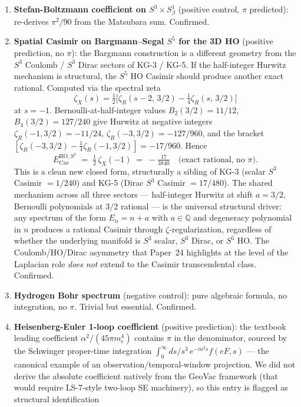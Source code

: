 \documentclass[11pt]{article}
\begin{document}
\begin{enumerate}
\setlength\itemsep{0pt}
\item \textbf{Stefan-Boltzmann coefficient on $S^3 \times S^1_\beta$}
(positive control, $\pi$ predicted): re-derives $\pi^2/90$ from the
Matsubara sum.  Confirmed.
\item \textbf{Spatial Casimir on Bargmann--Segal $S^5$ for the 3D HO}
(positive prediction, no $\pi$): the Bargmann construction is a
different geometry from the $S^3$ Coulomb / $S^3$ Dirac sectors of
KG-3 / KG-5.  If the half-integer Hurwitz mechanism is structural, the
$S^5$ HO Casimir should produce another exact rational.  Computed via
the spectral zeta
\[
\zeta_X(s) = \tfrac{1}{2}\bigl[\zeta_R(s{-}2,\, 3/2) -
\tfrac{1}{4}\zeta_R(s,\, 3/2)\bigr]
\]
at $s = -1$.  Bernoulli-at-half-integer values $B_2(3/2) = 11/12$,
$B_4(3/2) = 127/240$ give Hurwitz at negative integers
$\zeta_R(-1, 3/2) = -11/24$, $\zeta_R(-3, 3/2) = -127/960$, and the
bracket $[\zeta_R(-3, 3/2) - \tfrac{1}{4}\zeta_R(-1, 3/2)] = -17/960$.
Hence
\[
  E_\text{Cas}^{\text{HO}, S^5}
  \;=\; \tfrac{1}{2}\,\zeta_X(-1)
  \;=\; -\tfrac{17}{3840}
  \quad \text{(exact rational, no $\pi$).}
\]
This is a clean new closed form, structurally a sibling of KG-3
(scalar $S^3$ Casimir $= 1/240$) and KG-5 (Dirac $S^3$ Casimir
$= 17/480$).  The shared mechanism across all three sectors ---
half-integer Hurwitz at shift $a = 3/2$, Bernoulli polynomials at
$3/2$ rational --- is the universal structural driver: any spectrum
of the form $E_n = n + a$ with $a \in \mathbb{Q}$ and degeneracy
polynomial in $n$ produces a rational Casimir through
$\zeta$-regularization, regardless of whether the underlying manifold
is $S^3$ scalar, $S^3$ Dirac, or $S^5$ HO.  The Coulomb/HO/Dirac
asymmetry that Paper~24 highlights at the level of the Laplacian role
\emph{does not} extend to the Casimir transcendental class.
Confirmed.
\item \textbf{Hydrogen Bohr spectrum} (negative control): pure
algebraic formula, no integration, no $\pi$.  Trivial but essential.
Confirmed.
\item \textbf{Heisenberg-Euler 1-loop coefficient} (positive
prediction): the textbook leading coefficient $\alpha^2/(45\pi m_e^4)$
contains $\pi$ in the denominator, sourced by the Schwinger
proper-time integration $\int_0^\infty ds/s^3 \, e^{-m^2 s} f(eF, s)$
--- the canonical example of an observation/temporal-window
projection.  We did not derive the absolute coefficient natively from
the GeoVac framework (that would require LS-7-style two-loop SE
machinery), so this entry is flagged as structural identification

\end{enumerate}
\end{document}

